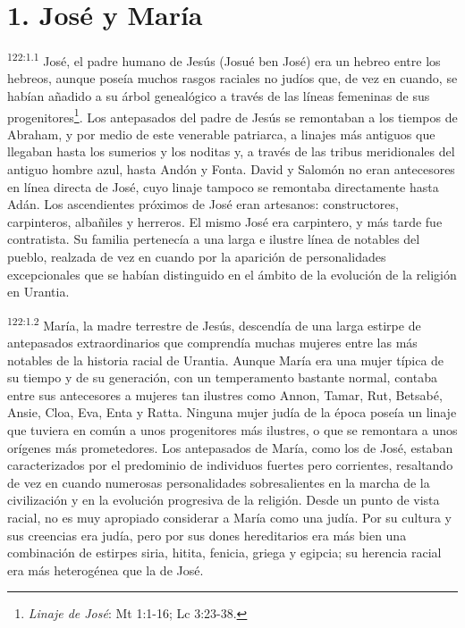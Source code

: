 \section*{1. José y María}
\par
\textsuperscript{122:1.1} José, el padre humano de Jesús (Josué ben José) era un hebreo entre los hebreos, aunque poseía muchos rasgos raciales no judíos que, de vez en cuando, se habían añadido a su árbol genealógico a través de las líneas femeninas de sus progenitores\footnote{\textit{Linaje de José}: Mt 1:1-16; Lc 3:23-38.}. Los antepasados del padre de Jesús se remontaban a los tiempos de Abraham, y por medio de este venerable patriarca, a linajes más antiguos que llegaban hasta los sumerios y los noditas y, a través de las tribus meridionales del antiguo hombre azul, hasta Andón y Fonta. David y Salomón no eran antecesores en línea directa de José, cuyo linaje tampoco se remontaba directamente hasta Adán. Los ascendientes próximos de José eran artesanos: constructores, carpinteros, albañiles y herreros. El mismo José era carpintero, y más tarde fue contratista. Su familia pertenecía a una larga e ilustre línea de notables del pueblo, realzada de vez en cuando por la aparición de personalidades excepcionales que se habían distinguido en el ámbito de la evolución de la religión en Urantia.

\par
\textsuperscript{122:1.2} María, la madre terrestre de Jesús, descendía de una larga estirpe de antepasados extraordinarios que comprendía muchas mujeres entre las más notables de la historia racial de Urantia. Aunque María era una mujer típica de su tiempo y de su generación, con un temperamento bastante normal, contaba entre sus antecesores a mujeres tan ilustres como Annon, Tamar, Rut, Betsabé, Ansie, Cloa, Eva, Enta y Ratta. Ninguna mujer judía de la época poseía un linaje que tuviera en común a unos progenitores más ilustres, o que se remontara a unos orígenes más prometedores. Los antepasados de María, como los de José, estaban caracterizados por el predominio de individuos fuertes pero corrientes, resaltando de vez en cuando numerosas personalidades sobresalientes en la marcha de la civilización y en la evolución progresiva de la religión. Desde un punto de vista racial, no es muy apropiado considerar a María como una judía. Por su cultura y sus creencias era judía, pero por sus dones hereditarios era más bien una combinación de estirpes siria, hitita, fenicia, griega y egipcia; su herencia racial era más heterogénea que la de José.

